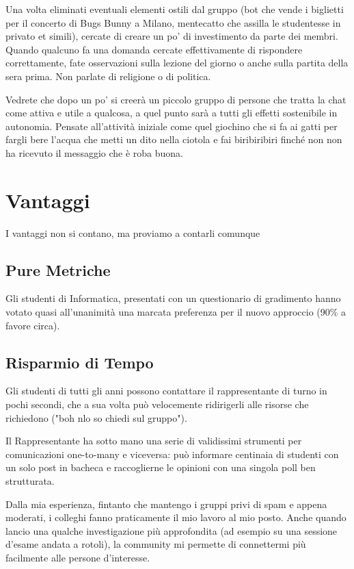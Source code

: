 \documentclass{article}
\begin{document}
Una volta eliminati eventuali elementi ostili dal gruppo (bot che vende i biglietti per il concerto di Bugs Bunny a Milano, mentecatto che assilla le studentesse in privato et simili), cercate di creare un po' di investimento da parte dei membri. Quando qualcuno fa una domanda cercate effettivamente di rispondere correttamente, fate osservazioni sulla lezione del giorno o anche sulla partita della sera prima. Non parlate di religione o di politica.


Vedrete che dopo un po' si creerà un piccolo gruppo di persone che tratta la chat come attiva e utile a qualcosa, a quel punto sarà a tutti gli effetti sostenibile in autonomia. Pensate all'attività iniziale come quel giochino che si fa ai gatti per fargli bere l'acqua che metti un dito nella ciotola e fai biribiribiri finché non non ha ricevuto il messaggio che è roba buona.

\section{Vantaggi}

I vantaggi non si contano, ma proviamo a contarli comunque

\subsection{Pure Metriche}

Gli studenti di Informatica, presentati con un questionario di gradimento hanno votato quasi all'unanimità una marcata preferenza per il nuovo approccio (90\% a favore circa).

\subsection{Risparmio di Tempo}

Gli studenti di tutti gli anni possono contattare il rappresentante di turno in pochi secondi, che a sua volta può velocemente ridirigerli alle risorse che richiedono ("boh nlo so chiedi sul gruppo").

Il Rappresentante ha sotto mano una serie di validissimi strumenti per comunicazioni one-to-many e viceversa: può informare centinaia di studenti con un solo post in bacheca e raccoglierne le opinioni con una singola poll ben strutturata.

Dalla mia esperienza, fintanto che mantengo i gruppi privi di spam e appena moderati, i colleghi fanno praticamente il mio lavoro al mio posto. Anche quando lancio una qualche investigazione più approfondita (ad esempio su una sessione d'esame andata a rotoli), la community mi permette di connettermi più facilmente alle persone d'interesse.
\end{document}
